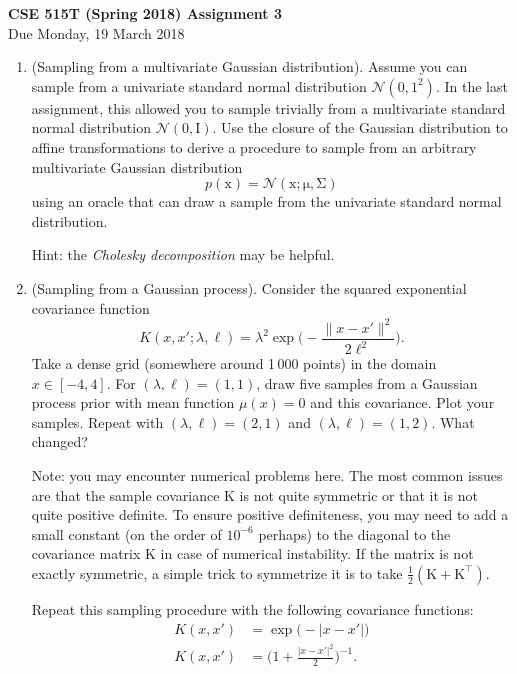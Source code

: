 \documentclass{article}
\newcommand{\mc}[1]{\mathcal{#1}}
\newcommand{\mat}[1]{\bm{\mathrm{#1}}}
\renewcommand{\vec}[1]{\bm{\mathrm{#1}}}
\newcommand{\trans}{^\top}
\begin{document}
{\large \textbf{CSE 515T (Spring 2018) Assignment 3}} \\
Due Monday, 19 March 2018 \\

\begin{enumerate}

\item
  (Sampling from a multivariate Gaussian distribution).  Assume you can sample
  from a univariate standard normal distribution $\mc{N}(0, 1^2)$.  In the last
  assignment, this allowed you to sample trivially from a multivariate standard
  normal distribution $\mc{N}(\vec{0}, \mat{I})$.  Use the closure of the
  Gaussian distribution to affine transformations to derive a procedure to
  sample from an arbitrary multivariate Gaussian distribution
  \[
    p(\vec{x}) = \mc{N}(\vec{x}; \vec{\mu}, \mat{\Sigma})
  \]
  using an oracle that can draw a sample from the univariate standard normal
  distribution.

  Hint: the \emph{Cholesky decomposition} may be helpful.

\item
  (Sampling from a Gaussian process).
  Consider the squared exponential covariance function
  \begin{equation}
    \label{sqdexp}
    K(x, x'; \lambda, \ell)
    =
    \lambda^2
    \exp\biggl(
    -\frac{\lVert x - x' \rVert^2}{2\ell^2}
    \biggr).
  \end{equation}
  Take a dense grid (somewhere around 1\,000 points) in the domain $x \in [-4,
    4]$.  For $(\lambda, \ell) = (1, 1)$, draw five samples from a Gaussian
  process prior with mean function $\mu(x) = 0$ and this covariance.  Plot your
  samples.  Repeat with $(\lambda, \ell) = (2, 1)$ and $(\lambda, \ell) = (1,
  2)$.  What changed?

  Note: you may encounter numerical problems here.  The most common issues are
  that the sample covariance $\mat{K}$ is not quite symmetric or that it is not
  quite positive definite.  To ensure positive definiteness, you may need to add
  a small constant (on the order of $10^{-6}$ perhaps) to the diagonal to the
  covariance matrix $\mat{K}$ in case of numerical instability.  If the matrix
  is not exactly symmetric, a simple trick to symmetrize it is to take
  $\frac{1}{2}(\mat{K} + \mat{K}\trans)$.

  Repeat this sampling procedure with the following covariance functions:
  \begin{align*}
    K(x, x')
    &=
    \exp\bigl(-\lvert x - x' \rvert\bigr)
    \\
    K(x, x')
    &=
    \biggl(1 + \frac{\lvert x - x' \rvert^2}{2}\biggr)^{-1}.
  \end{align*}


\end{enumerate}
\end{document}
